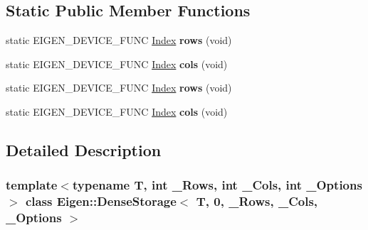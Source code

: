 \subsection*{Static Public Member Functions}
\begin{DoxyCompactItemize}
\item 
\mbox{\label{class_eigen_1_1_dense_storage_3_01_t_00_010_00_01___rows_00_01___cols_00_01___options_01_4_abb2f94317cb7458aba59d812bce90134}} 
static E\+I\+G\+E\+N\+\_\+\+D\+E\+V\+I\+C\+E\+\_\+\+F\+U\+NC \hyperlink{namespace_eigen_a62e77e0933482dafde8fe197d9a2cfde}{Index} {\bfseries rows} (void)
\item 
\mbox{\label{class_eigen_1_1_dense_storage_3_01_t_00_010_00_01___rows_00_01___cols_00_01___options_01_4_ab00b677e630f1a91a5cb271fc8609e9b}} 
static E\+I\+G\+E\+N\+\_\+\+D\+E\+V\+I\+C\+E\+\_\+\+F\+U\+NC \hyperlink{namespace_eigen_a62e77e0933482dafde8fe197d9a2cfde}{Index} {\bfseries cols} (void)
\item 
\mbox{\label{class_eigen_1_1_dense_storage_3_01_t_00_010_00_01___rows_00_01___cols_00_01___options_01_4_abb2f94317cb7458aba59d812bce90134}} 
static E\+I\+G\+E\+N\+\_\+\+D\+E\+V\+I\+C\+E\+\_\+\+F\+U\+NC \hyperlink{namespace_eigen_a62e77e0933482dafde8fe197d9a2cfde}{Index} {\bfseries rows} (void)
\item 
\mbox{\label{class_eigen_1_1_dense_storage_3_01_t_00_010_00_01___rows_00_01___cols_00_01___options_01_4_ab00b677e630f1a91a5cb271fc8609e9b}} 
static E\+I\+G\+E\+N\+\_\+\+D\+E\+V\+I\+C\+E\+\_\+\+F\+U\+NC \hyperlink{namespace_eigen_a62e77e0933482dafde8fe197d9a2cfde}{Index} {\bfseries cols} (void)
\end{DoxyCompactItemize}


\subsection{Detailed Description}
\subsubsection*{template$<$typename T, int \+\_\+\+Rows, int \+\_\+\+Cols, int \+\_\+\+Options$>$\newline
class Eigen\+::\+Dense\+Storage$<$ T, 0, \+\_\+\+Rows, \+\_\+\+Cols, \+\_\+\+Options $>$}



